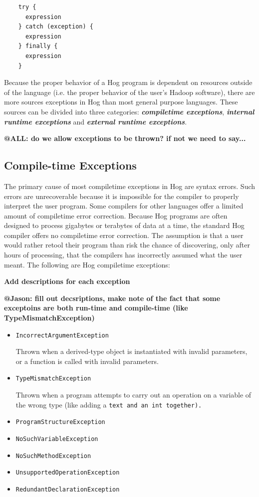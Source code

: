 \documentclass{article}
\begin{document}
\begin{verbatim}
    try {
      expression
    } catch (exception) {
      expression
    } finally {
      expression
    }
\end{verbatim}

Because the proper behavior of a Hog program is dependent on resources outside of
the language (i.e. the proper behavior of the user’s Hadoop software), there are
more sources exceptions in Hog than most general purpose languages. These sources
can be divided into three categories: \textbf{\emph{compile­time exceptions}},
\textbf{\emph{internal run­time exceptions}} and \textbf{\emph{external run­time
exceptions}}.

\textbf{@ALL: do we allow exceptions to be thrown? if not we need to say...}

\subsection{Compile-time Exceptions} %
\label{sub:compile_time_exceptions}

The primary cause of most compile­time exceptions in Hog are syntax errors. Such
errors are unrecoverable because it is impossible for the compiler to properly
interpret the user program. Some compilers for other languages offer a limited
amount of compile­time error correction. Because Hog programs are often designed
to process gigabytes or terabytes of data at a time, the standard Hog compiler
offers no compile­time error correction. The assumption is that a user would
rather re­tool their program than risk the chance of discovering, only after hours
of processing, that the compilers has incorrectly assumed what the user meant. The
following are Hog compile­time exceptions:

\textbf{Add descriptions for each exception}

\textbf{@Jason: fill out decsriptions, make note of the fact that some exceptoins are both run-time and compile-time
(like TypeMismatchException)}

\begin{itemize}
  \item[] \tt IncorrectArgumentException \rm
  
  Thrown when a derived-type object is instantiated with invalid parameters, or a function is called with invalid parameters.
  
  \item[] \tt TypeMismatchException \rm
  
  Thrown when a program attempts to carry out an operation on a variable of the wrong type (like adding a \tt text \rm and an
  \tt int \rm together).
  \item[] \tt ProgramStructureException \rm
  \item[] \tt NoSuchVariableException \rm
  \item[] \tt NoSuchMethodException \rm
  \item[] \tt UnsupportedOperationException \rm
  \item[] \tt RedundantDeclarationException \rm
\end{itemize}
\end{document}
